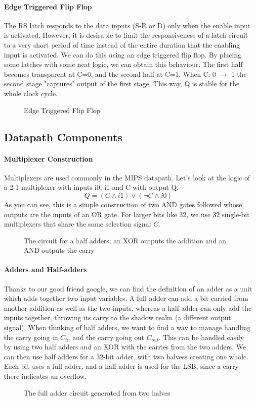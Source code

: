 \paragraph{Edge Triggered Flip Flop} The RS latch responds to the data inputs (S-R or D) only when the enable input is activated. However, it is desirable to limit the responsiveness of a latch circuit to a very short period of time instead of the entire duration that the enabling input is activated. We can do this using an edge triggered flip flop. By placing some latches with some neat logic, we can obtain this behaviour. The first half becomes transparent at C=0, and the second half at C=1. When C: 0 $\rightarrow$ 1 the second stage "captures" output of the first stage. This way, Q is stable for the whole clock cycle.
\begin{figure}[!htb]
	\caption{\label{fig:flipflop} Edge Triggered Flip Flop}
\end{figure}
\subsection{Datapath Components}
\paragraph{Multiplexer Construction} Multiplexers are used commonly in the MIPS datapath. Let's look at the logic of a 2-1 multiplexer with inputs i0, i1 and C with output Q. \[Q = (C \land i1) \lor (\neg C \land i0)\] As you can see, this is a simple construction of two AND gates followed whose outputs are the inputs of an OR gate. For larger bits like 32, we use 32 single-bit multiplexers that share the same selection signal $C$.
\begin{figure}[!htb]
	\caption{\label{fig:halfadderlogic} The circuit for a half adders; an XOR outputs the addition and an AND outputs the carry}
\end{figure}
\paragraph{Adders and Half-adders} Thanks to our good friend google, we can find the definition of an adder as a unit which adds together two input variables. A full adder can add a bit carried from another addition as well as the two inputs, whereas a half adder can only add the inputs together, throwing its carry to the shadow realm (a different output signal). When thinking of half adders, we want to find a way to manage handling the carry going in $C_{in}$ and the carry going out $C_{out}$. This can be handled easily by using two half adders and an XOR with the carries from the two adders. We can then use half adders for a 32-bit adder, with two halvess creating one whole. Each bit uses a full adder, and a half adder is used for the LSB, since a carry there indicates an overflow.
\begin{figure}[!htb]
	\caption{\label{fig:lsbadder} The full adder circuit generated from two halves}
\end{figure}

